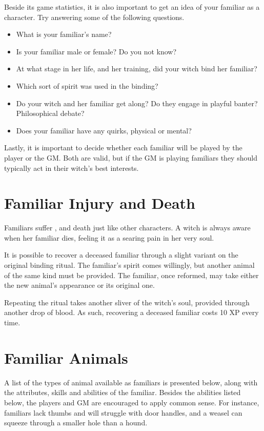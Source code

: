 Beside its game statistics, it is also important to get an idea of your familiar as a character.
Try answering some of the following questions.

\begin{itemize}
	\item What is your familiar's name?
	\item Is your familiar male or female?
		Do you not know?
	\item At what stage in her life, and her training, did your witch bind her familiar?
	\item Which sort of spirit was used in the binding? %
	\item Do your witch and her familiar get along?
		Do they engage in playful banter?
		Philosophical debate?
	\item Does your familiar have any quirks, physical or mental?
\end{itemize}

Lastly, it is important to decide whether each familiar will be played by the player or the GM.
Both are valid, but if the GM is playing familiars they should typically act in their witch's best interests.

\section{Familiar Injury and Death}

Familiars suffer ,  and death just like other characters.
A witch is always aware when her familiar dies, feeling it as a searing pain in her very soul.

It is possible to recover a deceased familiar through a slight variant on the original binding ritual.
The familiar's spirit comes willingly, but another animal of the same kind must be provided.
The familiar, once reformed, may take either the new animal's appearance or its original one.

Repeating the ritual takes another sliver of the witch's soul, provided through another drop of blood.
As such, recovering a deceased familiar costs 10 XP every time.

\section{Familiar Animals}

A list of the types of animal available as familiars is presented below, along with the attributes, skills and abilities of the familiar.
Besides the abilities listed below, the players and GM are encouraged to apply common sense.
For instance, familiars lack thumbs and will struggle with door handles, and a weasel can squeeze through a smaller hole than a hound.

